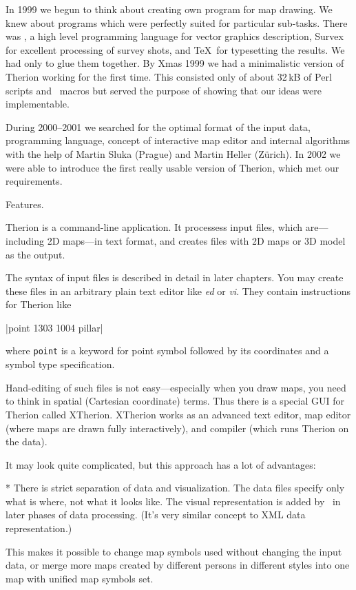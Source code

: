 In 1999 we begun to think about creating own program for map drawing. We knew 
about programs which were perfectly suited for particular sub-tasks. There 
was \MP, a high level programming language for vector graphics description, 
Survex for excellent processing of survey shots, and \TeX\ for typesetting the 
results. We had only to glue them together. By Xmas 
1999 we had a minimalistic version of Therion working for the first time. This 
consisted only of about 32\,kB of Perl scripts and \MP\ macros but served the 
purpose of showing that our ideas were implementable.

During 2000--2001 we searched for the optimal format of the input data, programming 
language, concept of interactive map editor and internal algorithms with the 
help of Martin Sluka (Prague) and Martin Heller (Z\"urich). In 2002 we were able to 
introduce the first really usable version of Therion, which met our requirements.


\subchapter Features.

Therion is a command-line application. It processess input files, which 
are---including 2D maps---in text format, and creates files with 2D maps or 
3D model as the output.

The syntax of input files is described in detail in later chapters. 
You may create these files in an arbitrary plain text editor like 
{\it ed} or {\it vi}. They contain instructions for Therion like 

|point 1303 1004 pillar| 

where {\tt point} is a keyword for point symbol 
followed by its coordinates and a symbol type specification.

Hand-editing of such files is not easy---especially when you draw maps, you 
need to think in spatial (Cartesian coordinate) terms. Thus there is a special 
GUI for Therion called XTherion. XTherion works as an advanced text editor, map 
editor (where maps are drawn fully interactively), and compiler (which runs
Therion on the data).

It may look quite complicated, but this approach has a lot of advantages:

\list
* There is strict separation of data and visualization. The data files specify 
  only what is where, not what it looks like. The visual representation 
  is added by \MP\ in later phases of data processing. (It's very 
  similar concept to XML data representation.) 
  
  This makes it possible to change map symbols used without changing the 
  input data, or merge more maps created by different persons in different 
  styles into one map with unified map symbols set.


